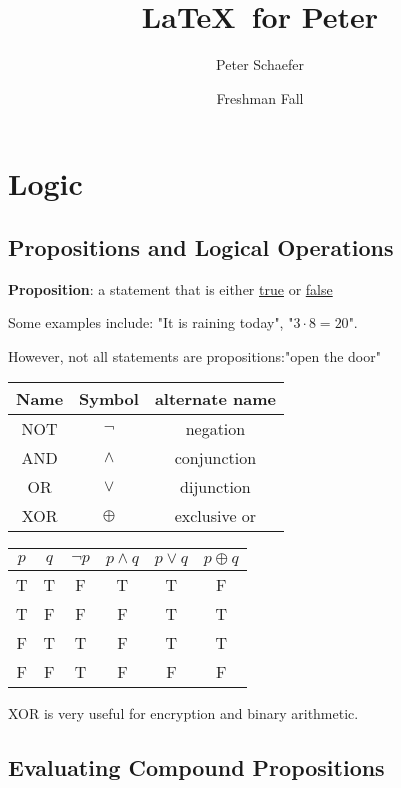 \documentclass{article}
\title{\LaTeX\ for Peter}
\author{Peter Schaefer}
\date{Freshman Fall}
\begin{document}
\maketitle

\tableofcontents

\newpage

\section{Logic}
\subsection{Propositions and Logical Operations}

\textbf{Proposition}: a statement that is either \underline{true} or \underline{false}

Some examples include: "It is raining today",  "\(3 \cdot 8 = 20 \)".

However, not all statements are propositions:"open the door"


\begin{tabular}{|c|c|c|}
  \hline
  \textbf{Name} & \textbf{Symbol} & \textbf{alternate name} \\
  \hline
  NOT & $\lnot$ & negation \\
  AND & $\land$ & conjunction \\
  OR & $\lor$ & dijunction \\
  XOR & $\oplus$ & exclusive or \\
  \hline
\end{tabular}
\quad
\begin{tabular}{|c|c||c|c|c|c|}
  \hline
  \textbf{$p$} & \textbf{$q$} & \textbf{$\lnot p$} & \textbf{$p \land q$} & \textbf{$p \lor q$} & \textbf{$p \oplus q$} \\
  \hline
  T & T & F & T & T & F \\
  T & F & F & F & T & T \\
  F & T & T & F & T & T \\
  F & F & T & F & F & F \\
  \hline
\end{tabular}

XOR is very useful for encryption and binary arithmetic.
  
\subsection{Evaluating Compound Propositions}
\end{document}
